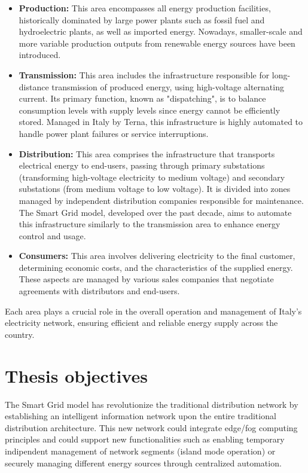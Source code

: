 \begin{itemize}
\item \textbf{Production:} This area encompasses all energy production facilities, historically dominated by large power plants such as fossil fuel and hydroelectric plants, as well as imported energy. Nowadays, smaller-scale and more variable production outputs from renewable energy sources have been introduced.
\item \textbf{Transmission:} This area includes the infrastructure responsible for long-distance transmission of produced energy, using high-voltage alternating current. Its primary function, known as "dispatching"\cite{i1-1}, is to balance consumption levels with supply levels since energy cannot be efficiently stored. Managed in Italy by Terna\cite{i1-2}, this infrastructure is highly automated to handle power plant failures or service interruptions.
\item \textbf{Distribution:} This area comprises the infrastructure that transports electrical energy to end-users, passing through primary substations (transforming high-voltage electricity to medium voltage) and secondary substations (from medium voltage to low voltage). It is divided into zones managed by independent distribution companies responsible for maintenance. The Smart Grid model, developed over the past decade, aims to automate this infrastructure similarly to the transmission area to enhance energy control and usage.
\item \textbf{Consumers:} This area involves delivering electricity to the final customer, determining economic costs, and the characteristics of the supplied energy. These aspects are managed by various sales companies that negotiate agreements with distributors and end-users.
\end{itemize}


Each area plays a crucial role in the overall operation and management of Italy's electricity network, ensuring efficient and reliable energy supply across the country.

\section{Thesis objectives}
The Smart Grid model has revolutionize the traditional distribution network by establishing an intelligent information network upon the entire traditional distribution architecture. This new network could integrate edge/fog computing principles and could support new functionalities such as enabling temporary indipendent management of network segments (island mode operation) or securely managing different energy sources through centralized automation.

